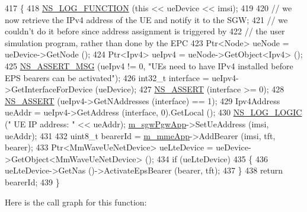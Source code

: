 \begin{DoxyCode}
417 \{
418   \hyperlink{log-macros-disabled_8h_a90b90d5bad1f39cb1b64923ea94c0761}{NS\_LOG\_FUNCTION} (\textcolor{keyword}{this} << ueDevice << imsi);
419 
420   \textcolor{comment}{// we now retrieve the IPv4 address of the UE and notify it to the SGW;}
421   \textcolor{comment}{// we couldn't do it before since address assignment is triggered by}
422   \textcolor{comment}{// the user simulation program, rather than done by the EPC   }
423   Ptr<Node> ueNode = ueDevice->GetNode (); 
424   Ptr<Ipv4> ueIpv4 = ueNode->GetObject<Ipv4> ();
425   \hyperlink{assert_8h_aff5ece9066c74e681e74999856f08539}{NS\_ASSERT\_MSG} (ueIpv4 != 0, \textcolor{stringliteral}{"UEs need to have IPv4 installed before EPS bearers can be
       activated"});
426   int32\_t \textcolor{keyword}{interface }=  ueIpv4->GetInterfaceForDevice (ueDevice);
427   \hyperlink{assert_8h_a6dccdb0de9b252f60088ce281c49d052}{NS\_ASSERT} (interface >= 0);
428   \hyperlink{assert_8h_a6dccdb0de9b252f60088ce281c49d052}{NS\_ASSERT} (ueIpv4->GetNAddresses (interface) == 1);
429   Ipv4Address ueAddr = ueIpv4->GetAddress (interface, 0).GetLocal ();
430   \hyperlink{group__logging_ga88acd260151caf2db9c0fc84997f45ce}{NS\_LOG\_LOGIC} (\textcolor{stringliteral}{" UE IP address: "} << ueAddr);  \hyperlink{classns3_1_1MmWavePointToPointEpcHelper_a91427a039a393a8e4faaf4d08813d929}{m\_sgwPgwApp}->SetUeAddress (imsi, 
      ueAddr);
431   
432   uint8\_t bearerId = \hyperlink{classns3_1_1MmWavePointToPointEpcHelper_acee46bd21104461e8b459a309815dea9}{m\_mmeApp}->AddBearer (imsi, tft, bearer);
433   Ptr<MmWaveUeNetDevice> ueLteDevice = ueDevice->GetObject<MmWaveUeNetDevice> ();
434   \textcolor{keywordflow}{if} (ueLteDevice)
435   \{
436     ueLteDevice->GetNas ()->ActivateEpsBearer (bearer, tft);
437   \}
438   \textcolor{keywordflow}{return} bearerId;
439 \}
\end{DoxyCode}


Here is the call graph for this function\+:


